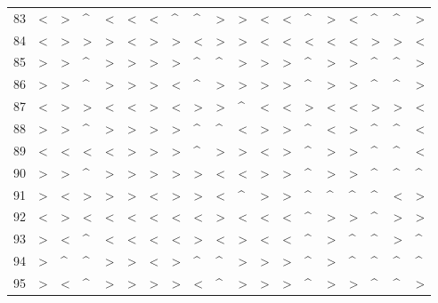 \begin{tabular}{lllllllllllllllllll}
83  &  < &  > &  \textasciicircum  &  < &  < &  < &  \textasciicircum  &  \textasciicircum  &  > &  > &  < &  < &  \textasciicircum  &  > &  < &  \textasciicircum  &  \textasciicircum  &  > \\
84  &  < &  > &  > &  > &  < &  > &  > &  < &  > &  > &  < &  < &  < &  < &  < &  > &  > &  < \\
85  &  > &  > &  \textasciicircum  &  > &  > &  > &  > &  \textasciicircum  &  \textasciicircum  &  > &  > &  > &  \textasciicircum  &  > &  > &  \textasciicircum  &  \textasciicircum  &  > \\
86  &  > &  > &  \textasciicircum  &  > &  > &  > &  < &  \textasciicircum  &  > &  > &  > &  > &  \textasciicircum  &  > &  > &  \textasciicircum  &  \textasciicircum  &  > \\
87  &  < &  > &  > &  < &  < &  > &  < &  > &  > &  \textasciicircum  &  < &  < &  > &  < &  < &  > &  > &  < \\
88  &  > &  > &  \textasciicircum  &  > &  > &  > &  > &  \textasciicircum  &  \textasciicircum  &  < &  > &  > &  \textasciicircum  &  < &  > &  \textasciicircum  &  \textasciicircum  &  < \\
89  &  < &  < &  < &  < &  > &  > &  > &  \textasciicircum  &  > &  > &  < &  > &  \textasciicircum  &  > &  > &  \textasciicircum  &  \textasciicircum  &  < \\
90  &  > &  > &  \textasciicircum  &  > &  > &  > &  > &  > &  < &  < &  > &  > &  \textasciicircum  &  > &  > &  \textasciicircum  &  \textasciicircum  &  \textasciicircum  \\
91  &  > &  < &  > &  > &  > &  < &  > &  > &  < &  \textasciicircum  &  > &  > &  \textasciicircum  &  \textasciicircum  &  \textasciicircum  &  \textasciicircum  &  < &  > \\
92  &  < &  > &  < &  < &  < &  < &  < &  < &  > &  < &  < &  < &  \textasciicircum  &  > &  > &  \textasciicircum  &  > &  > \\
93  &  > &  < &  \textasciicircum  &  < &  < &  < &  < &  > &  < &  > &  < &  < &  \textasciicircum  &  > &  \textasciicircum  &  \textasciicircum  &  > &  \textasciicircum  \\
94  &  > &  \textasciicircum  &  \textasciicircum  &  > &  > &  < &  > &  \textasciicircum  &  \textasciicircum  &  > &  > &  > &  \textasciicircum  &  > &  \textasciicircum  &  \textasciicircum  &  \textasciicircum  &  \textasciicircum  \\
95  &  > &  < &  \textasciicircum  &  > &  > &  > &  > &  < &  \textasciicircum  &  > &  > &  > &  \textasciicircum  &  > &  > &  \textasciicircum  &  \textasciicircum  &  > \\

\end{tabular}

